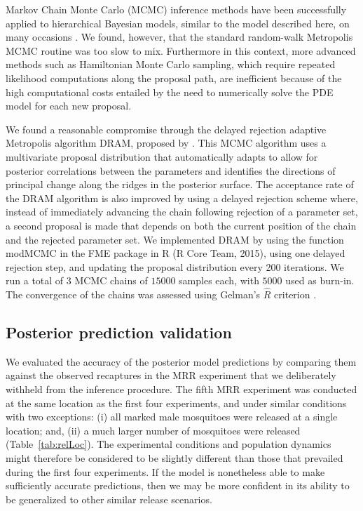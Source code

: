 \documentclass[]{bmcart}
\begin{document}
Markov Chain Monte Carlo (MCMC) inference methods have been successfully applied to hierarchical Bayesian models, similar to the model described here, on many occasions \cite[see for example][]{McGoff2012a, Chkrebtii2016, Wikle2003, Ruggeri2017}. We found, however, that the standard random-walk Metropolis MCMC routine was too slow to mix. Furthermore in this context, more advanced methods such as Hamiltonian Monte Carlo sampling, which require repeated likelihood computations along the proposal path, are inefficient because of the high computational costs entailed by the need to numerically solve the PDE model for each new proposal. 

We found a reasonable compromise through the delayed rejection adaptive Metropolis algorithm DRAM, proposed by \cite{Haario2001a}. This MCMC algorithm uses a multivariate proposal distribution that automatically adapts to allow for posterior correlations between the parameters and identifies the directions of principal change along the ridges in the posterior surface. The acceptance rate of the DRAM algorithm is also improved by using a delayed rejection scheme where, instead of immediately advancing the chain following rejection of a parameter set, a second proposal is made that depends on both the current position of the chain and the rejected parameter set. We implemented DRAM by using the function modMCMC in the FME package \cite{Soetaert2010} in R (R Core Team, 2015), using one delayed rejection step, and updating the proposal distribution every 200 iterations. We run a total of $3$ MCMC chains of $15000$ samples each, with $5000$ used as burn-in. The convergence of the chains was assessed using Gelman's $\hat{R}$ criterion \citep[see ][chapter 11]{Gelman2014}.

\subsection{Posterior prediction validation} 
We evaluated the accuracy of the posterior model predictions by comparing them against the observed recaptures in the MRR experiment that we deliberately withheld from the inference procedure. The fifth MRR experiment was conducted at the same location as the first four experiments, and under similar conditions with two exceptions: (i) all marked male mosquitoes were released at a single location; and, (ii) a much larger number of mosquitoes were released (Table~\ref{tab:relLoc}). The experimental conditions and population dynamics might therefore be considered to be slightly different than those that prevailed during the first four experiments. If the model is nonetheless able to make sufficiently accurate predictions, then we may be more confident in its ability to be generalized to other similar release scenarios.
\end{document}
